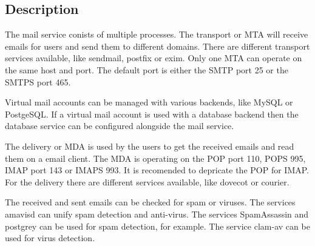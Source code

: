 \subsection{Description}

The mail service conists of multiple processes. The transport or MTA
will receive emails for users and send them to different domains.
There are different transport services available, like
sendmail\cite{sendmail}, postfix\cite{postfix} or exim\cite{exim}.
Only one MTA can operate on the same host and port. The default port
is either the SMTP port 25 or the SMTPS port 465.

Virtual mail accounts can be managed with various backends, like MySQL or
PostgeSQL. If a virtual mail account is used with a database backend then
the database  service can be configured alongside the mail service.

The delivery or MDA is used by the users to get the received emails and read
them on a email client. The MDA is operating on the POP port 110, POPS 995, IMAP
port 143 or IMAPS 993. It is recomended to depricate the POP for IMAP.
For the delivery there are different services available, like
dovecot\cite{dovecot} or courier\cite{courier}.

The received and sent emails can be checked for spam or viruses.
The services amavisd\cite{amavisd} can unify spam detection and anti-virus.
The services SpamAssassin\cite{SpamAssassin} and postgrey\cite{postgrey}
can be used for spam detection, for example. 
The service clam-av\cite{clam-av} can be used
for virus detection.
